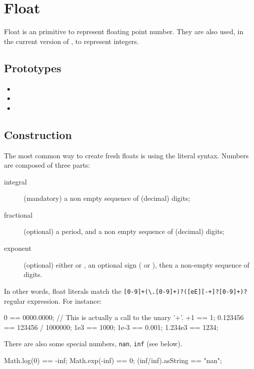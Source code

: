\section{Float}

Float is an \us primitive to represent floating point number.  They
are also used, in the current version of \us, to represent integers.

\subsection{Prototypes}

\begin{itemize}
\item {}
\item {}
\item {}
\end{itemize}

\subsection{Construction}
\label{sec:float:ctor}

The most common way to create fresh floats is using the literal
syntax.  Numbers are composed of three parts:
\begin{description}
\item[integral] (mandatory) a non empty sequence of (decimal) digits;
\item[fractional] (optional) a period, and a non empty sequence of
  (decimal) digits;
\item[exponent] (optional) either  or , an optional
  sign (\samp{+} or \samp{-}), then a non-empty sequence of digits.
\end{description}

In other words, float literals match the
\lstinline|[0-9]+(\.[0-9]+)?([eE][-+]?[0-9]+)?|
regular expression.  For instance:

\begin{urbiassert}[firstnumber=last]
0 == 0000.0000;
// This is actually a call to the unary '+'.
+1 == 1;
0.123456 == 123456 / 1000000;
1e3 == 1000;
1e-3 == 0.001;
1.234e3 == 1234;
\end{urbiassert}

There are also some special numbers, \lstinline|nan|, \lstinline|inf|
(see below).

\begin{urbiassert}[firstnumber=last]
Math.log(0) == -inf;
Math.exp(-inf) == 0;
(inf/inf).asString == "nan";
\end{urbiassert}

